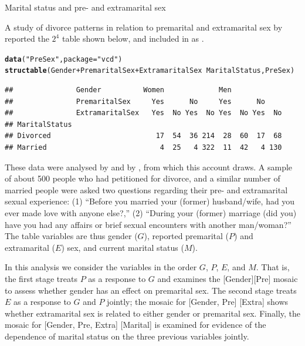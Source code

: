 \documentclass[11pt]{book}\usepackage[]{graphicx}\usepackage[]{color}
\makeatletter
\newcommand{\hlstr}[1]{\textcolor[rgb]{0.192,0.494,0.8}{#1}}%
\newcommand{\hlopt}[1]{\textcolor[rgb]{0,0,0}{#1}}%
\newcommand{\hlstd}[1]{\textcolor[rgb]{0.345,0.345,0.345}{#1}}%
\newcommand{\hlkwc}[1]{\textcolor[rgb]{0.333,0.667,0.333}{#1}}%
\newcommand{\hlkwd}[1]{\textcolor[rgb]{0.737,0.353,0.396}{\textbf{#1}}}%
\newenvironment{kframe}{%
 \def\at@end@of@kframe{}%
 \ifinner\ifhmode%
  \def\at@end@of@kframe{\end{minipage}}%
  \begin{minipage}{\columnwidth}%
 \fi\fi%
 \def\FrameCommand##1{\hskip\@totalleftmargin \hskip-\fboxsep
 \colorbox{shadecolor}{##1}\hskip-\fboxsep
     \hskip-\linewidth \hskip-\@totalleftmargin \hskip\columnwidth}%
 \MakeFramed {\advance\hsize-\width
   \@totalleftmargin\z@ \linewidth\hsize
   \@setminipage}}%
 {\par\unskip\endMakeFramed%
 \at@end@of@kframe}
\newenvironment{knitrout}{}{} %
\renewenvironment{knitrout}{\small\renewcommand{\baselinestretch}{.85}}{} %
\makeatother
\begin{document}
\begin{Example}[marital1]{Marital status and pre- and extramarital sex}

A study of divorce patterns in relation to premarital and extramarital sex
by \citet{ThornesCollard:79} reported
the \(2^4\) table shown below, and included in  as
.

\begin{knitrout}
\color{fgcolor}\begin{kframe}
\begin{alltt}
\hlkwd{data}\hlstd{(}\hlstr{"PreSex"}\hlstd{,} \hlkwc{package}\hlstd{=}\hlstr{"vcd"}\hlstd{)}
\hlkwd{structable}\hlstd{(Gender}\hlopt{+}\hlstd{PremaritalSex}\hlopt{+}\hlstd{ExtramaritalSex} \hlopt{~} \hlstd{MaritalStatus, PreSex)}
\end{alltt}
\begin{verbatim}
##               Gender          Women             Men            
##               PremaritalSex     Yes      No     Yes      No    
##               ExtramaritalSex   Yes  No Yes  No Yes  No Yes  No
## MaritalStatus                                                  
## Divorced                         17  54  36 214  28  60  17  68
## Married                           4  25   4 322  11  42   4 130
\end{verbatim}
\end{kframe}
\end{knitrout}


These data were analysed by \citet[\S 7.2.4]{Agresti:90}
and by \citet{Friendly:94a,Friendly:00:VCD}, from which this account draws.
A sample of
about 500 people who had petitioned for divorce, and a similar number
of married people were asked two questions regarding their pre- and
extramarital sexual experience:  (1) ``Before you married your
(former) husband/wife, had you ever made love with anyone else?,''
(2) ``During your (former) marriage (did you) have you had any
affairs or brief sexual encounters with another man/woman?'' 
The
table variables are thus gender ($G$), reported premarital ($P$)
and extramarital ($E$) sex, and current marital status ($M$).

In this analysis we consider the variables in the order $G$, $P$,
$E$, and $M$.  That is, the first stage  treats $P$ as a
response to $G$ and examines the [Gender][Pre] mosaic to assess
whether gender has an effect on premarital sex.  The second stage
treats $E$ as a response to $G$ and $P$ jointly;  the
mosaic for [Gender, Pre] [Extra] shows whether extramarital sex
is related to either gender or premarital sex.  Finally, the mosaic
for [Gender, Pre, Extra] [Marital] is examined for evidence of the
dependence of marital status on the three previous variables jointly.

\end{Example}
\end{document}
